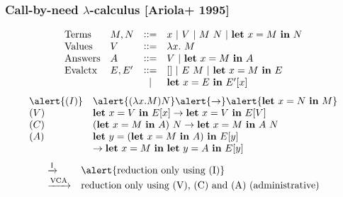 \documentclass[dvipdfmx,cjk,xcolor=dvipsnames,envcountsect,notheorems,12pt]{beamer}
\theoremstyle{definition}
\newcommand{\LET}[3]{\mathbf{let}~#1=#2~\mathbf{in}~#3}
\newcommand{\CALLBYNEEDI}{\xrightarrow{\mathrm{I}}}
\newcommand{\CALLBYNEEDVCA}{\xrightarrow{\mathrm{VCA}}}
\begin{document}
\begin{frame}
	\frametitle{Call-by-need $\lambda$-calculus [Ariola+ 1995]}
	{\large
		\vspace{-1cm}
		\[\begin{array}{llcl}
			\mbox{Terms} & M,N & \vcentcolon\vcentcolon = & x~|~V~|~M~N~|~\LET{x}{M}{N} \\
			\mbox{Values} & V & \vcentcolon\vcentcolon = & \lambda x.~M \\
			\mbox{Answers} & A & \vcentcolon\vcentcolon = & V~|~\LET{x}{M}{A} \\
			\mbox{Evalctx} & E,E' & \vcentcolon\vcentcolon = & [] ~|~ E~M ~|~\LET{x}{M}{E} \\
			& & | & \LET{x}{E}{E'[x]} \\
		\end{array}\] }
	\vspace{-3mm}
	{\large
		\[ \begin{array}{ll}
			\alert{(I)} & \alert{(\lambda x.M)N} \alert{\rightarrow} \alert{\LET{x}{N}{M}} \\
			(V) & \LET{x}{V}{E[x]} \rightarrow \LET{x}{V}{E[V]} \\
			(C) & (\LET{x}{M}{A})~N \rightarrow \LET{x}{M}{A~N} \\
			(A) & \LET{y}{(\LET{x}{M}{A})}{E[y]} \\
					& \rightarrow \LET{x}{M}{\LET{y}{A}{E[y]}} \\
		\end{array}\]}
	\vspace{-3mm}
	{\normalsize
		\[ \begin{array}{ll}
			\CALLBYNEEDI & \mbox{\alert{reduction only using (I)}}\\
			\CALLBYNEEDVCA & \mbox{reduction only using (V), (C) and (A) (administrative)}
		\end{array} \]}
\end{frame}
\end{document}
